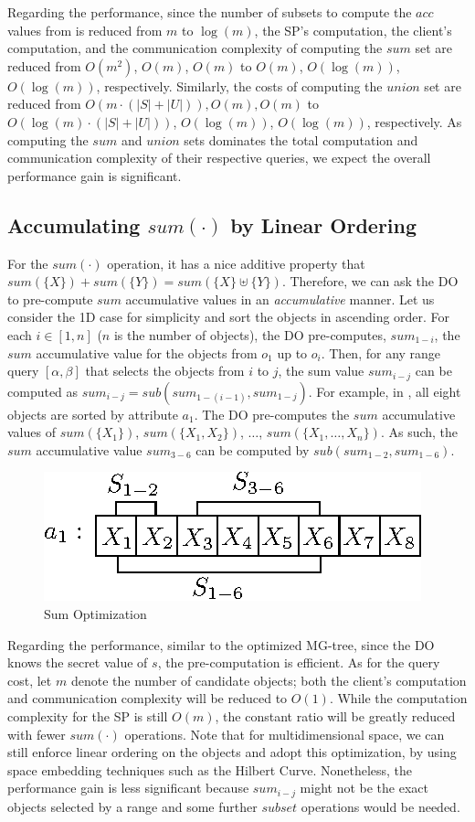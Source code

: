 Regarding the performance, since the number of subsets to compute the $acc$ values from is reduced from $m$ to $\log(m)$, the SP's computation, the client's computation, and the communication complexity of computing the $sum$ set are reduced from $O(m^2)$, $O(m)$, $O(m)$ to $O(m)$, $O(\log(m))$, $O(\log(m))$, respectively. Similarly, the costs of computing the $union$ set are reduced from $O(m \cdot (|S|+ |U|)), O(m), O(m)$ to $O(\log(m) \cdot (|S| + |U|))$, $O(\log(m))$, $O(\log(m))$, respectively. As computing the $sum$ and $union$ sets dominates the total computation and communication complexity of their respective queries, we expect the overall performance gain is significant.

\subsection{Accumulating $sum(\cdot)$ by Linear Ordering}
For the $sum(\cdot)$ operation, it has a nice additive property that $sum(\{X\}) + sum(\{Y\}) = sum(\{X\} \uplus \{Y\})$. Therefore, we can ask the DO to pre-compute $sum$ accumulative values in an \emph{accumulative} manner. Let us consider the 1D case for simplicity and sort the objects in ascending order. For each $i \in [1, n]$ ($n$ is the number of objects), the DO pre-computes, $sum_{1-i}$, the $sum$ accumulative value for the objects from $o_1$ up to $o_i$. Then, for any range query $[\alpha, \beta]$ that selects the objects from $i$ to $j$, the sum value $sum_{i-j}$ can be computed as $sum_{i-j} = sub(sum_{1-(i-1)}, sum_{1-j})$. For example, in , all eight objects are sorted by attribute $a_1$. The DO pre-computes the $sum$ accumulative values of $sum(\{X_1\})$, $sum(\{X_1, X_2\})$, $\dots$, $sum(\{X_1, \dots, X_n\})$. As such, the $sum$ accumulative value $sum_{3-6}$ can be computed by $sub(sum_{1-2}, sum_{1- 6})$.

\begin{figure}
  \centering
  \includegraphics[width=0.4\linewidth]{figs/aggregate-queries/sum_opt.eps}
  \caption{Sum Optimization}\label{fig:aggregate-queries:sum_opt}
\end{figure}

Regarding the performance, similar to the optimized MG-tree, since the DO knows the secret value of $s$, the pre-computation is efficient. As for the query cost, let $m$ denote the number of candidate objects; both the client's computation and communication complexity will be reduced to $O(1)$. While the computation complexity for the SP is still $O(m)$, the constant ratio will be greatly reduced with fewer $sum(\cdot)$ operations. Note that for multidimensional space, we can still enforce linear ordering on the objects and adopt this optimization, by using space embedding techniques such as the Hilbert Curve. Nonetheless, the performance gain is less significant because $sum_{i-j}$ might not be the exact objects selected by a range and some further $subset$ operations would be needed.

